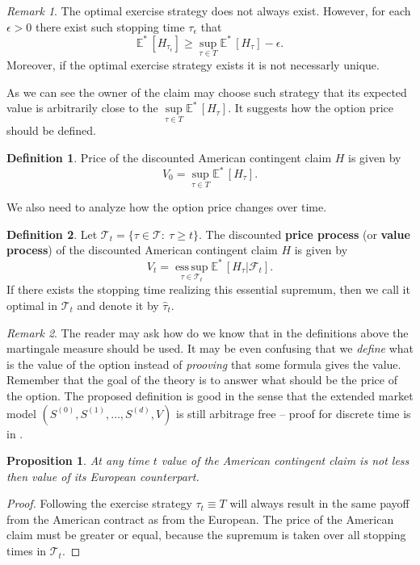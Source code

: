 \documentclass[a4paper,12pt, oneside]{book}
\newtheorem{prop}[thm]{Proposition}
\theoremstyle{definition}
\newtheorem{mydef}{Definition}[chapter]
\theoremstyle{remark}
\newtheorem{remark}{Remark}[chapter]
\def\Em{{\mathbb{E}^*}\,}
\DeclareMathOperator*{\esssup}{ess\,sup}
\begin{document}
\begin{remark}
 The optimal exercise strategy does not always exist. However, for each $\epsilon > 0$ there exist such stopping time $\tau_\epsilon$ that
 \[ \Em[H_{\tau_\epsilon}] \geq \sup\limits_{\tau \in T} \Em[H_{\tau}] - \epsilon.\]
 Moreover, if the optimal exercise strategy exists it is not necessarly unique.
\end{remark}
As we can see the owner of the claim may choose such strategy that its expected value is arbitrarily close to the $\sup\limits_{\tau \in T} \Em[H_{\tau}]$. It suggests how the option price should be defined.
\begin{mydef}
 Price of the discounted American contingent claim $H$ is given by
\begin{equation}
\label{eq:AM_optPrice}
V_0 = \sup\limits_{\tau \in T} \Em[H_{\tau}]. 
\end{equation}
\end{mydef}
We also need to analyze how the option price changes over time.
\begin{mydef}
 \label{def:valueProcess}
 Let  $\mathcal{T}_t = \{ \tau \in \mathcal{T}:\ \tau \geq t \}$. The discounted \textbf{price process} (or \textbf{value process}) of the  discounted American contingent claim $H$ is given by
\begin{equation}
\label{eq:AM_valueProcess}
V_t = \esssup\limits_{\tau \in  \mathcal{T}_t} \Em[H_{\tau} | \mathcal{F}_t]. 
\end{equation}
 If there exists the stopping time realizing this essential supremum, then we call it optimal in $\mathcal{T}_t$ and denote it by $\hat{\tau}_t$.
\end{mydef}

\begin{remark}
 The reader may ask how do we know that in the definitions above the martingale measure should be used. It may be even confusing that we \emph{define} what is the value of the option instead of \emph{prooving} that some formula gives the value. Remember that the goal of the theory is to answer what should be the price of the option. The proposed definition is good in the sense that the extended market model $(S^{(0)}, S^{(1)}, \ldots, S^{(d)}, V)$ is still arbitrage free -- proof for discrete time is in \cite{follmer}.
\end{remark}


\begin{prop}
 At any time $t$ value of the American contingent claim is not less then value of its European counterpart.
\end{prop}
\begin{proof}
 Following the exercise strategy $\tau_t \equiv T$ will always result in the same payoff from the American contract as from the European. The price of the American claim must be greater or equal, because the supremum is taken over all stopping times in $\mathcal{T}_t$.
\end{proof}
\end{document}
